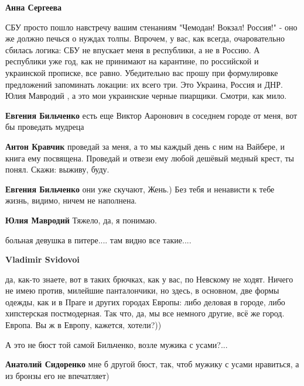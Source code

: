 \begin{itemize}
\begin{itemize} %
\textbf{Анна Сергеева} 

СБУ просто пошло навстречу вашим стенаниям "Чемодан! Вокзал! Россия!" - оно же
должно печься о нуждах толпы. Впрочем, у вас, как всегда, очаровательно сбилась
логика: СБУ не впускает меня в республики, а не в Россию. А республики уже год,
как не принимают на карантине, по российской и украинской прописке, все равно.
Убедительно вас прошу при формулировке предложений запоминать локации: их всего
три. Это Украина, Россия и ДНР. Юлия Мавродий , а это мои украинские черные
пиарщики. Смотри, как мило.

\textbf{Евгения Бильченко} есть еще Виктор Ааронович в соседнем городе от меня, вот бы проведать мудреца

\textbf{Антон Кравчик} проведай за меня, а то мы каждый день с ним на Вайбере, и книга ему посвящена. Проведай и отвези ему любой дешёвый медный крест, ты понял. Скажи: выживу, буду.

\textbf{Евгения Бильченко} они уже скучают, Жень.) Без тебя и ненависти к тебе жизнь, видимо, ничем не наполнена.

\textbf{Юлия Мавродий} Тяжело, да, я понимаю.
\end{itemize} %

больная девушка в питере.... там видно все такие....

\begin{itemize} %
\textbf{Vladimir Svidovoi} 

да, как-то знаете, вот в таких брючках, как у вас, по Невскому не ходят. Ничего
не имею против, милейшие панталончики, но здесь, в основном, две формы одежды,
как и в Праге и других городах Европы: либо деловая в городе, либо хипстерская
постмодерная. Так что, да, мы все немного другие, всё же город. Европа. Вы ж в
Европу, кажется, хотели?))

\end{itemize} %

А это не бюст той самой Бильченко, возле мужика с усами?...

\begin{itemize} %
\textbf{Анатолий Сидоренко} мне б другой бюст, так, чтоб мужику с усами нравиться, а из бронзы его не впечатляет)
\end{itemize} %

\end{itemize} %
